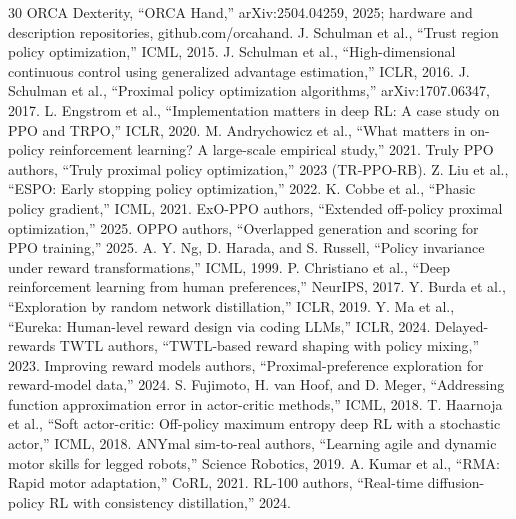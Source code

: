 \documentclass[conference]{IEEEtran}
\begin{document}
\begin{thebibliography}{30}\small
{} ORCA Dexterity, ``ORCA Hand,'' arXiv:2504.04259, 2025; hardware and description repositories, github.com/orcahand.
 J. Schulman et al., ``Trust region policy optimization,'' ICML, 2015.
 J. Schulman et al., ``High-dimensional continuous control using generalized advantage estimation,'' ICLR, 2016.
 J. Schulman et al., ``Proximal policy optimization algorithms,'' arXiv:1707.06347, 2017.
 L. Engstrom et al., ``Implementation matters in deep RL: A case study on PPO and TRPO,'' ICLR, 2020.
 M. Andrychowicz et al., ``What matters in on-policy reinforcement learning? A large-scale empirical study,'' 2021.
 Truly PPO authors, ``Truly proximal policy optimization,'' 2023 (TR-PPO-RB).
 Z. Liu et al., ``ESPO: Early stopping policy optimization,'' 2022.
 K. Cobbe et al., ``Phasic policy gradient,'' ICML, 2021.
 ExO-PPO authors, ``Extended off-policy proximal optimization,'' 2025.
 OPPO authors, ``Overlapped generation and scoring for PPO training,'' 2025.
 A. Y. Ng, D. Harada, and S. Russell, ``Policy invariance under reward transformations,'' ICML, 1999.
 P. Christiano et al., ``Deep reinforcement learning from human preferences,'' NeurIPS, 2017.
 Y. Burda et al., ``Exploration by random network distillation,'' ICLR, 2019.
 Y. Ma et al., ``Eureka: Human-level reward design via coding LLMs,'' ICLR, 2024.
 Delayed-rewards TWTL authors, ``TWTL-based reward shaping with policy mixing,'' 2023.
 Improving reward models authors, ``Proximal-preference exploration for reward-model data,'' 2024.
 S. Fujimoto, H. van Hoof, and D. Meger, ``Addressing function approximation error in actor-critic methods,'' ICML, 2018.
 T. Haarnoja et al., ``Soft actor-critic: Off-policy maximum entropy deep RL with a stochastic actor,'' ICML, 2018.
 ANYmal sim-to-real authors, ``Learning agile and dynamic motor skills for legged robots,'' Science Robotics, 2019.
 A. Kumar et al., ``RMA: Rapid motor adaptation,'' CoRL, 2021.
 RL-100 authors, ``Real-time diffusion-policy RL with consistency distillation,'' 2024.
\end{thebibliography}
\end{document}
